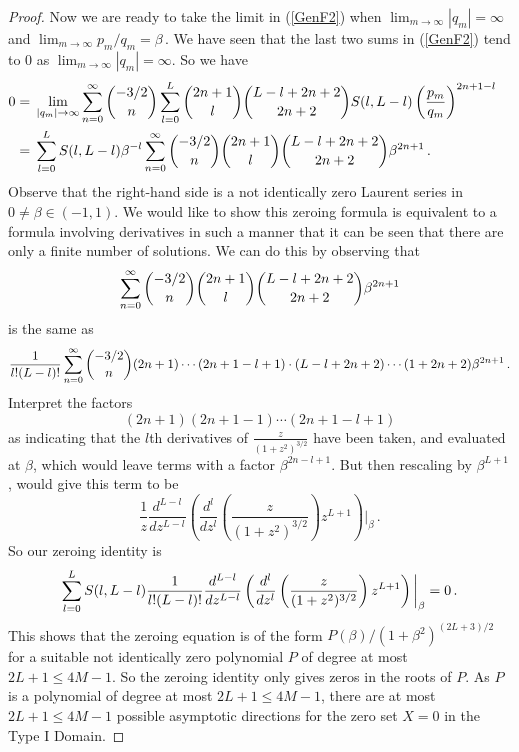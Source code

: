 \documentclass{article}
\theoremstyle{remark}
\numberwithin{equation}{section}
\begin{document}
\begin{proof}
Now we are ready to take the limit in (\ref{GenF2}) when $\displaystyle{\lim_{m \rightarrow \infty}{|q_m|} = \infty}$ and $\displaystyle{\lim_{m \rightarrow \infty}{p_m/q_m} = \beta\,.}$ 
We have seen that the last two sums in (\ref{GenF2}) tend to $0$ as $\displaystyle{\lim_{m \rightarrow \infty}{|q_m|} = \infty}$. So we have 
\begin{equation} \notag \begin{split}
0 & = \, \lim_{|q_m| \rightarrow \infty} \sum_{n=0}^\infty{\binom{-3/2}{n} \sum_{l=0}^L \binom{2n+1}{l} \binom{L-l+2n+2}{2n+2} S(l,L-l)
\left( \frac{p_m}{q_m} \right)^{2n+1-l}} \cr  
& = \, \sum_{l=0}^L S(l,L-l) \beta^{-l} \sum_{n=0}^\infty \binom{-3/2}{n} \binom{2n+1}{l} \binom{L-l+2n+2}{2n+2} \beta^{2n+1}\,. \cr
\end{split} \end{equation}
Observe that the right-hand side is a not identically zero Laurent series in $0 \neq \beta \in (-1,1)$.  
We would like to show this zeroing formula is equivalent to a formula involving derivatives in such a manner that it can be seen that there are only a finite number of solutions.
We can do this by observing that
\begin{equation} \notag  
\sum_{n=0}^\infty{\binom{-3/2}{n} \binom{2n+1}{l} \binom{L-l+2n+2}{2n+2} \beta^{2n+1}}
\end{equation} 
is the same as
\begin{equation} \notag 
\frac {1}{l!(L-l)!} \sum_{n=0}^\infty \binom{-3/2}{n} (2n+1) \cdots (2n +1 -l+1) \cdot (L-l+2n+2)\cdots (1+2n+2) \beta^{2n+1}\,.
\end{equation} 
Interpret the factors 
$$(2n+1)(2n+1-1) \cdots (2n+1-l+1)$$ 
as indicating that the $l$th derivatives of $\displaystyle{\frac z{(1+z^2)^{3/2}}}$ have been taken, and evaluated at $\beta$, which would leave terms with a factor $\beta^{2n - l +1}$.
But then rescaling by $\beta^{L+1}$, would give this term to be
$$\frac 1{z} \frac {d^{L-l}}{dz^{L-l}} \left (\frac {d^l}{dz^l}\left (\frac {z}{(1 +z^2)^{3/2}}\right )z^{L+1}\right )\bigg |_\beta\,.$$
So our zeroing identity is
\begin{equation} \notag
\sum_{l=0}^L S(l,L-l) \frac {1}{l!(L-l)!} \frac{d^{L-l}}{dz^{L-l}} 
\left( \frac {d^l}{dz^l} \left( \frac{z}{(1+z^2)^{3/2}} \right)z^{L+1} \right)\bigg |_\beta = 0\,.
\end{equation}
This shows that the zeroing equation is of the form $P(\beta)/(1 +\beta^2)^{(2L+3)/2}$ for a suitable not identically zero polynomial $P$ of degree at most $2L+1 \leq 4M-1$.
So the zeroing identity only gives zeros in the roots of $P$. As $P$ is a polynomial of degree at most $2L+1 \leq 4M-1$, there are at most $2L+1 \leq 4M-1$ 
possible asymptotic directions for the zero set $X=0$ in the Type I Domain.
\end{proof}
\end{document}
